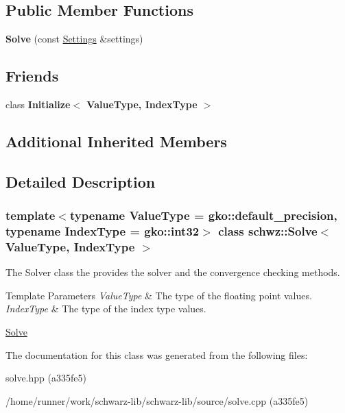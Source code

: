 \subsection*{Public Member Functions}
\begin{DoxyCompactItemize}
\item 
\mbox{\label{classschwz_1_1Solve_a24250987949518cc92649066d3ce147d}} 
{\bfseries Solve} (const \hyperlink{structschwz_1_1Settings}{Settings} \&settings)
\end{DoxyCompactItemize}
\subsection*{Friends}
\begin{DoxyCompactItemize}
\item 
\mbox{\label{classschwz_1_1Solve_a7044b349fe5363eeace2d1a56b38f650}} 
class {\bfseries Initialize$<$ Value\+Type, Index\+Type $>$}
\end{DoxyCompactItemize}
\subsection*{Additional Inherited Members}


\subsection{Detailed Description}
\subsubsection*{template$<$typename Value\+Type = gko\+::default\+\_\+precision, typename Index\+Type = gko\+::int32$>$\newline
class schwz\+::\+Solve$<$ Value\+Type, Index\+Type $>$}

The Solver class the provides the solver and the convergence checking methods. 


\begin{DoxyTemplParams}{Template Parameters}
{\em Value\+Type} & The type of the floating point values. \\
\hline
{\em Index\+Type} & The type of the index type values.\\
\hline
\end{DoxyTemplParams}
\hyperlink{group__solve}{Solve} 

The documentation for this class was generated from the following files\+:\begin{DoxyCompactItemize}
\item 
solve.\+hpp (a335fe5)\item 
/home/runner/work/schwarz-\/lib/schwarz-\/lib/source/solve.\+cpp (a335fe5)\end{DoxyCompactItemize}
